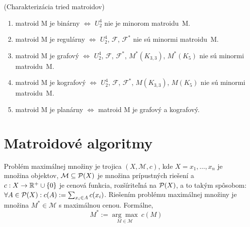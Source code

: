 \begin{theorem_hard}{(Charakterizácia tried matroidov)}
\begin{enumerate}
    \item matroid M je binárny $\Longleftrightarrow$ $U_2^4$ nie je minorom matroidu~M.
    \item matroid M je regulárny $\Longleftrightarrow$ $U_2^4$, $\mathcal{F}$, $\mathcal{F}^*$ nie sú minormi matroidu~M.
    \item matroid M je grafový $\Longleftrightarrow$ $U_2^4$, $\mathcal{F}$, $\mathcal{F}^*$, $M^*(K_{3,3})$, $M^*(K_{5})$ nie sú minormi matroidu~M.
    \item matroid M je kografový $\Longleftrightarrow$ $U_2^4$, $\mathcal{F}$, $\mathcal{F}^*$, $M(K_{3,3})$, $M(K_{5})$ nie sú minormi matroidu~M.
    \item matroid M je planárny $\Longleftrightarrow$ matroid M je grafový a kografový.
\end{enumerate}
\end{theorem_hard}


\section{Matroidové algoritmy}

\begin{definition}

Problém maximálnej množiny je trojica $(X, \mathcal{M}, c)$, kde 
$X = {x_1, \ldots, x_n}$ je množina objektov, 
$\mathcal{M} \subseteq \mathcal{P}(X)$ je množina prípustných riešení a $c: X \to \mathbb{R}^+ \cup \left\{0\right\}$
je cenová funkcia, rozšíriteľná na $\mathcal{P}(X)$, a to takým spôsobom: $\forall A \in \mathcal{P}(X): c(A) := \sum_{x_i \in A} c(x_i) $.
Riešením problému maximálnej množiny je množina $M^* \in \mathcal{M}$ s maximálnou cenou. Formálne,
$$M^* := \underset{M \in \mathcal{M}}{\arg\max}~c(M)$$

\end{definition}

